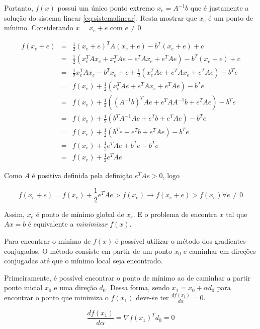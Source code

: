 Portanto, $f(x)$ possui um único ponto extremo $x_e = A^{-1}b$ que é justamente a solução do sistema linear \ref{eq:sistemalinear}. Resta mostrar que $x_e$ é um ponto de mínimo.
Considerando $x = x_e + e$ com $e \neq 0 $


\begin{eqnarray}
     f(x_e + e) & = & \frac{1}{2} (x_e + e)^T A (x_e + e) - b^T(x_e + e) + c \\
                & = & \frac{1}{2} (x_e^TAx_e + x_e^TAe + e^TAx_e + e^TAe )- b^T(x_e + e) + c \\
                & = & \frac{1}{2} x_e^TAx_e -b^Tx_e + c + \frac{1}{2} ( x_e^TAe + e^TAx_e + e^TAe ) - b^Te \\
                & = & f(x_e) + \frac{1}{2} ( x_e^TAe + e^TAx_e + e^TAe ) - b^Te \\
                & = & f(x_e) + \frac{1}{2} ( (A^{-1}b)^TAe + e^TAA^{-1}b + e^TAe ) - b^Te \\
                & = & f(x_e) + \frac{1}{2} ( b^TA^{-1}Ae + e^Tb + e^TAe ) - b^Te \\
                & = & f(x_e) + \frac{1}{2} ( b^Te + e^Tb + e^TAe ) - b^Te \\
                & = & f(x_e) + \frac{1}{2}  e^TAe  + b^Te - b^Te \\
                & = & f(x_e) + \frac{1}{2}  e^TAe
\end{eqnarray}


Como $A$ é positiva definida pela definição $e^TAe  > 0$, logo

\begin{equation}
    f(x_e + e) = f(x_e) + \frac{1}{2}  e^TAe > f(x_e)\rightarrow  f(x_e + e) > f(x_e) \forall e \neq 0
\end{equation}


Assim, $x_e$ é ponto de mínimo global de $x_e$. E o problema de encontra $x$ tal que $Ax = b$ é equivalente a \textit{minimizar} $f(x)$.

Para encontrar o mínimo de $f(x)$ é possível utilizar o método dos gradientes conjugados. O método consiste em partir de um ponto $x_0$ e caminhar em direções conjugadas até que o mínimo local seja encontrado.

Primeiramente, é possível encontrar o ponto de mínimo ao de caminhar a partir ponto inicial $x_0$ e uma direção $d_0$. Dessa forma, sendo $x_1 = x_0 + \alpha d_0$ para encontrar o ponto que minimiza o $f(x_1)$ deve-se ter $\frac{d f(x_1)}{d\alpha} = 0$.

\begin{equation}
    \frac{df(x_1)}{d \alpha} =  \nabla f(x_1)^T d_0 = 0
\end{equation}

